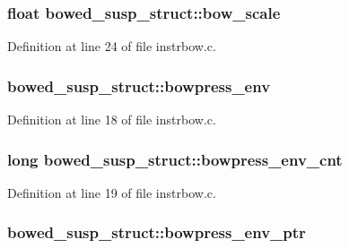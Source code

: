 \subsubsection[{\texorpdfstring{bow\+\_\+scale}{bow_scale}}]{\setlength{\rightskip}{0pt plus 5cm}float bowed\+\_\+susp\+\_\+struct\+::bow\+\_\+scale}\hypertarget{structbowed__susp__struct_a1a9ca5150d12c6b6d8bdcd3e6fd752bc}{}\label{structbowed__susp__struct_a1a9ca5150d12c6b6d8bdcd3e6fd752bc}


Definition at line 24 of file instrbow.\+c.

\subsubsection[{\texorpdfstring{bowpress\+\_\+env}{bowpress_env}}]{ bowed\+\_\+susp\+\_\+struct\+::bowpress\+\_\+env}\hypertarget{structbowed__susp__struct_acf8c959e51a82dda0d5c8edb536bbb2f}{}\label{structbowed__susp__struct_acf8c959e51a82dda0d5c8edb536bbb2f}


Definition at line 18 of file instrbow.\+c.

\subsubsection[{\texorpdfstring{bowpress\+\_\+env\+\_\+cnt}{bowpress_env_cnt}}]{\setlength{\rightskip}{0pt plus 5cm}long bowed\+\_\+susp\+\_\+struct\+::bowpress\+\_\+env\+\_\+cnt}\hypertarget{structbowed__susp__struct_aeb7c5688850e99fec088db58820c2d81}{}\label{structbowed__susp__struct_aeb7c5688850e99fec088db58820c2d81}


Definition at line 19 of file instrbow.\+c.

\subsubsection[{\texorpdfstring{bowpress\+\_\+env\+\_\+ptr}{bowpress_env_ptr}}]{ bowed\+\_\+susp\+\_\+struct\+::bowpress\+\_\+env\+\_\+ptr}\hypertarget{structbowed__susp__struct_a6f0a99130bd00e52e575dde97d20494f}{}\label{structbowed__susp__struct_a6f0a99130bd00e52e575dde97d20494f}


